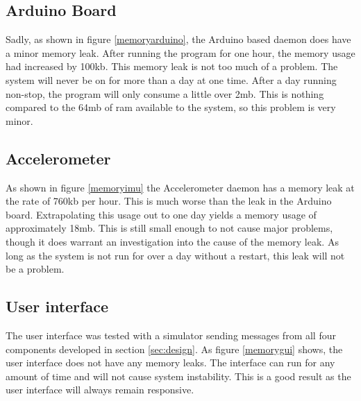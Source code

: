 \subsection{Arduino Board}

Sadly, as shown in figure \ref{memoryarduino}, the Arduino based daemon does have a minor memory leak. After running the program for one hour, the memory usage had increased by 100kb. This memory leak is not too much of a problem. The system will never be on for more than a day at one time. After a day running non-stop, the program will only consume a little over 2mb. This is nothing compared to the 64mb of ram available to the system, so this problem is very minor.



\subsection{Accelerometer}

As shown in figure \ref{memoryimu} the Accelerometer daemon has a memory leak at the rate of 760kb per hour. This is much worse than the leak in the Arduino board. Extrapolating this usage out to one day yields a memory usage of approximately 18mb. This is still small enough to not cause major problems, though it does warrant an investigation into the cause of the memory leak. As long as the system is not run for over a day without a restart, this leak will not be a problem.


\subsection{User interface}

The user interface was tested with a simulator sending messages from all four components developed in section \ref{sec:design}. As figure \ref{memorygui} shows, the user interface does not have any memory leaks. The interface can run for any amount of time and will not cause system instability. This is a good result as the user interface will always remain responsive.


